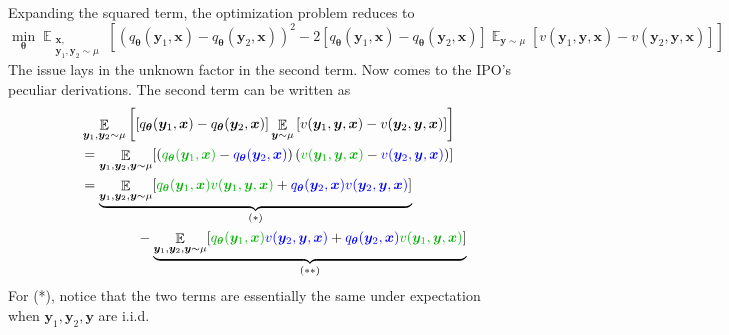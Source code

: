 \documentclass[11pt,a4paper]{article}
\begin{document}
Expanding the squared term, the optimization problem reduces to
\begin{equation}
\label{eq:qioqli}
\min_{\boldsymbol \theta}  \mathop{\mathbb{E}}_{\substack{\bm{x},\\ \bm{y}_1, \bm{y}_2\sim \mu}} \left[ (q_{\boldsymbol \theta}(\bm{y}_1, \bm{x})- q_{\boldsymbol \theta}(\bm{y}_2, \bm{x}))^2 - 2 [q_{\boldsymbol \theta}(\bm{y}_1, \bm{x}) - q_{\boldsymbol \theta}(\bm{y}_2, \bm{x})]\mathop{\mathbb{E}}_{\bm{y} \sim \mu}\left[v(\bm{y}_1, \bm{y}, \bm{x}) - v(\bm{y}_2, \bm{y}, \bm{x}) \right]  \right]
\end{equation}
The issue lays in the unknown factor in the second term.
Now comes to the IPO's peculiar derivations. The second term can be written as
\begin{align*}
\quad \quad &\mathop{\mathbb{E}}_{\bm{y}_1, \bm{y}_2 \sim \mu} \left[ [q_{\boldsymbol \theta}(\bm{y}_1, \bm{x})- q_{\boldsymbol \theta}(\bm{y}_2, \bm{x})]  \mathop{\mathbb{E}}_{\bm{y} \sim \mu}\left[ v(\bm{y}_1, \bm{y}, \bm{x}) - v(\bm{y}_2, \bm{y}, \bm{x}) \right]  \right] \\
&= \mathop{\mathbb{E}}_{\bm{y}_1, \bm{y}_2, \bm{y} \sim \mu}[({\green q_{\boldsymbol \theta}(\bm{y}_1, \bm{x})} - {\blue q_{\boldsymbol \theta}(\bm{y}_2, \bm{x})}) \left({\green v(\bm{y}_1, \bm{y}, \bm{x})} - {\blue v(\bm{y}_2, \bm{y}, \bm{x})} \right)] \\
&= \underbrace{\mathop{\mathbb{E}}_{\bm{y}_1, \bm{y}_2, \bm{y} \sim \mu} [{\green q_{\boldsymbol \theta}({\green \bm{y}_1}, \bm{x}) v(\bm{y}_1, \bm{y}, \bm{x})} + {\blue q_{\boldsymbol \theta}(\bm{y}_2, \bm{x}) v(\bm{y}_2, \bm{y}, \bm{x})}]}_{(*)} \\
&\qquad \qquad - \underbrace{\mathop{\mathbb{E}}_{\bm{y}_1, \bm{y}_2, \bm{y} \sim \mu } [{\green q_{\boldsymbol \theta}(\bm{y}_1, \bm{x})} {\blue v(\bm{y}_2, \bm{y}, \bm{x})}+ {\blue q_{\boldsymbol \theta}(\bm{y}_2, \bm{x})} {\green v(\bm{y}_1, \bm{y}, \bm{x})}] }_{(**)}
\end{align*}
For (*), notice that the two terms are essentially the same under expectation when $\bm{y}_1, \bm{y}_2, \bm{y}$ are i.i.d.
\end{document}
